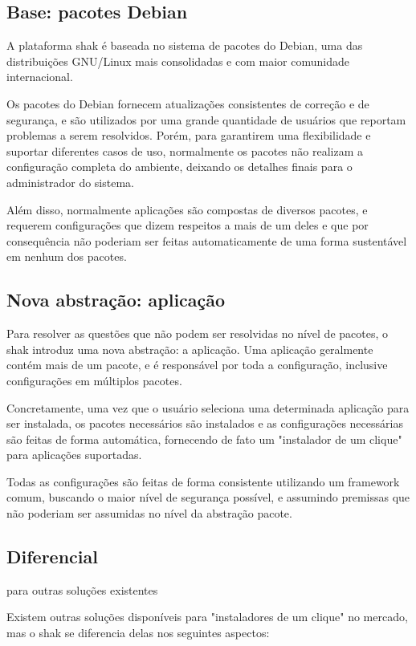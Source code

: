 \begin{anexosenv}
\subsection{Base: pacotes Debian}

A plataforma shak é baseada no sistema de pacotes do Debian, uma das
distribuições GNU/Linux mais consolidadas e com maior comunidade internacional.

Os pacotes do Debian fornecem atualizações consistentes de correção e de
segurança, e são utilizados por uma grande quantidade de usuários que
reportam problemas a serem resolvidos. Porém, para garantirem uma
flexibilidade e suportar diferentes casos de uso, normalmente os pacotes não
realizam a configuração completa do ambiente, deixando os detalhes finais
para o administrador do sistema.

Além disso, normalmente aplicações são compostas de diversos pacotes, e
requerem configurações que dizem respeitos a mais de um deles e que por
consequência não poderiam ser feitas automaticamente de uma forma sustentável
em nenhum dos pacotes.

\subsection{Nova abstração: aplicação}

Para resolver as questões que não podem ser resolvidas no nível de pacotes, o
shak introduz uma nova abstração: a aplicação. Uma aplicação geralmente
contém mais de um pacote, e é responsável por toda a configuração, inclusive
configurações em múltiplos pacotes.

Concretamente, uma vez que o usuário seleciona uma determinada aplicação para
ser instalada, os pacotes necessários são instalados e as configurações
necessárias são feitas de forma automática, fornecendo de fato um "instalador
de um clique" para aplicações suportadas.

Todas as configurações são feitas de forma consistente utilizando um framework
comum, buscando o maior nível de segurança possível, e assumindo premissas que
não poderiam ser assumidas no nível da abstração pacote.

\subsection{Diferencial} para outras soluções existentes

Existem outras soluções disponíveis para "instaladores de um clique" no
mercado, mas o shak se diferencia delas nos seguintes aspectos:


\end{anexosenv}
